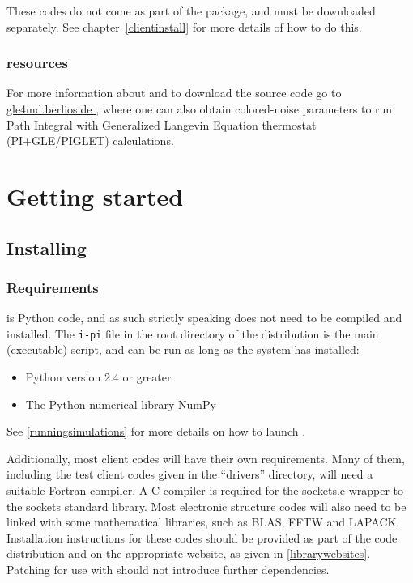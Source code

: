 \documentclass[11pt,english,fleqn]{report}
\begin{document}
These codes do not come as part of the \ipi package, and must be
downloaded separately. See chapter~\ref{clientinstall} for more details
of how to do this. 


\subsection{\ipi resources}

For more information about \ipi{} and to download the source code
go to \url{gle4md.berlios.de }, where one can also obtain colored-noise
parameters to run Path Integral with Generalized Langevin Equation
thermostat (PI+GLE/PIGLET) calculations.


\chapter{Getting started}

\label{getstarted}


\section{Installing \ipi}

\label{install}


\subsection{Requirements}

\ipi is Python code, and as such strictly speaking does not 
need to be compiled and installed. The {\tt i-pi} file in the
root directory of the distribution is the main (executable) script, 
and can be run as long as the system has installed:
\begin{itemize}
\item Python version 2.4 or greater
\item The Python numerical library NumPy
\end{itemize}
See \ref{runningsimulations} for more details on how to launch
\ipi.

Additionally, most client codes will have their own requirements.
Many of them, including the test client codes given in the {}``drivers''
directory, will need a suitable Fortran compiler. A C compiler is
required for the sockets.c wrapper to the sockets standard library.
Most electronic structure codes will also need to be linked with some
mathematical libraries, such as BLAS, FFTW and LAPACK. Installation
instructions for these codes should be provided as part of the code
distribution and on the appropriate website, as given in \ref{librarywebsites}.
Patching for use with \ipi{} should not introduce further dependencies.
\end{document}

